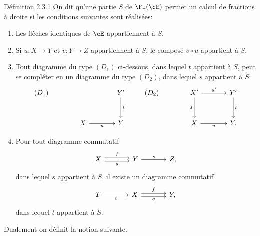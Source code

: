 \begin{statement}{Définition 2.3.1}
On dit qu'une partie $S$ de $\Fl(\cE)$ permet un calcul de fractions à droite si les conditions suivantes sont réalisées:
\begin{enumerate}[label=(\alph*)]
\item Les flèches identiques de $\cE$ appartiennent à $S$.
\item Si $u:X\to Y$ et $v:Y\to Z$ appartiennent à $S$, le composé $v\circ u$ appartient à $S$.
\item Tout diagramme du type $(D_1)$ ci-dessous, dans lequel $t$ appartient à $S$, peut se compléter en un diagramme du type $(D_2)$, dans lequel $s$ appartient à $S$:
\[
\begin{tikzcd}[column sep=large,row sep=large]
(D_1)& & Y' \arrow[d,"t"]\\
& X \arrow[r,"u"'] & Y
\end{tikzcd}
\qquad
\begin{tikzcd}[column sep=large,row sep=large]
(D_2)& X' \arrow[r,"u'"] \arrow[d,"s"'] & Y' \arrow[d,"t"]\\
& X \arrow[r,"u"'] & Y .
\end{tikzcd}
\]
\item Pour tout diagramme commutatif
\[
\begin{tikzcd}[column sep=large]
X \arrow[r,shift left,"f"] \arrow[r,shift right,"g"'] & Y \arrow[r,"s"] & Z,
\end{tikzcd}
\]
dans lequel $s$ appartient à $S$, il existe un diagramme commutatif
\[
\begin{tikzcd}[column sep=large]
T \arrow[r,"t"'] & X \arrow[r,shift left,"f"] \arrow[r,shift right,"g"'] & Y,
\end{tikzcd}
\]
dans lequel $t$ appartient à $S$.
\end{enumerate}
\end{statement}

Dualement on définit la notion suivante.

